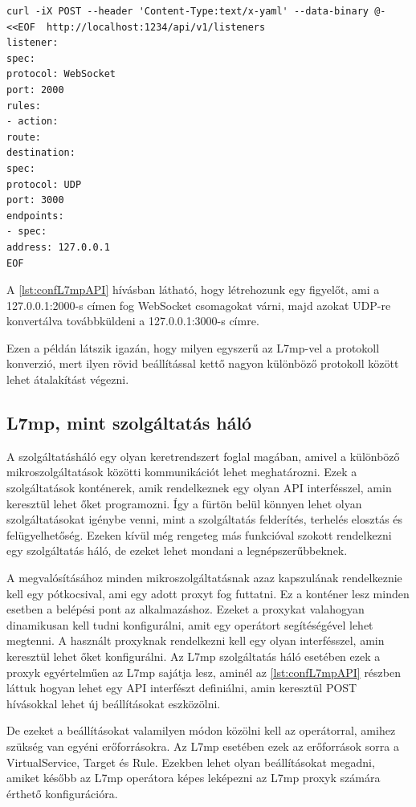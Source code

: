 \begin{lstlisting}[caption=L7mp konfigurálása API-n keresztül, label=lst:confL7mpAPI]
curl -iX POST --header 'Content-Type:text/x-yaml' --data-binary @- <<EOF  http://localhost:1234/api/v1/listeners
listener:
spec:
protocol: WebSocket
port: 2000
rules:
- action:
route:
destination:
spec:
protocol: UDP
port: 3000
endpoints:
- spec:
address: 127.0.0.1
EOF
\end{lstlisting}

A \ref{lst:confL7mpAPI} hívásban látható, hogy létrehozunk egy figyelőt, ami a 127.0.0.1:2000-s
címen fog WebSocket csomagokat várni, majd azokat UDP-re konvertálva továbbküldeni 
a 127.0.0.1:3000-s címre.

Ezen a példán látszik igazán, hogy milyen egyszerű az L7mp-vel a protokoll konverzió,
mert ilyen rövid beállítással kettő nagyon különböző protokoll között lehet 
átalakítást végezni.

\subsection{L7mp, mint szolgáltatás háló}

A szolgáltatásháló egy olyan keretrendszert foglal magában, amivel a különböző 
mikroszolgáltatások közötti kommunikációt lehet meghatározni. Ezek a szolgáltatások 
konténerek, amik rendelkeznek egy olyan API interfésszel, amin keresztül lehet 
őket programozni. Így a fürtön belül könnyen lehet olyan szolgáltatásokat 
igénybe venni, mint a szolgáltatás felderítés, terhelés elosztás és felügyelhetőség.
Ezeken kívül még rengeteg más funkcióval szokott rendelkezni egy szolgáltatás háló,
de ezeket lehet mondani a legnépszerűbbeknek.

A megvalósításához minden mikroszolgáltatásnak azaz kapszulának rendelkeznie kell 
egy pótkocsival, ami egy adott proxyt fog futtatni. Ez a konténer lesz minden esetben
a belépési pont az alkalmazáshoz. Ezeket a proxykat valahogyan dinamikusan kell tudni
konfigurálni, amit egy operátort segítéségével lehet megtenni. A használt proxyknak 
rendelkezni kell egy olyan interfésszel, amin keresztül lehet őket konfigurálni. 
Az L7mp szolgáltatás háló esetében ezek a proxyk egyértelműen az L7mp sajátja lesz,
aminél az \ref{lst:confL7mpAPI} részben láttuk hogyan lehet egy API interfészt definiálni, amin 
keresztül POST hívásokkal lehet új beállításokat eszközölni.

De ezeket a beállításokat valamilyen módon közölni kell az operátorral, amihez 
szükség van egyéni erőforrásokra. Az L7mp esetében ezek az erőforrások sorra a 
VirtualService, Target és Rule. Ezekben lehet olyan beállításokat megadni, amiket
később az L7mp operátora képes leképezni az L7mp proxyk számára érthető konfigurációra.

